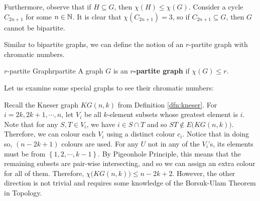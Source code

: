 \documentclass[math]{amznotes}
\makeatletter
\let\save@mathaccent\mathaccent
\newcommand*\if@single[3]{%
  \setbox0\hbox{${\mathaccent"0362{#1}}^H$}%
  \setbox2\hbox{${\mathaccent"0362{\kern0pt#1}}^H$}%
  \ifdim\ht0=\ht2 #3\else #2\fi
  }
\newcommand*\rel@kern[1]{\kern#1\dimexpr\macc@kerna}
\newcommand*\widebar[1]{\@ifnextchar^{{\wide@bar{#1}{0}}}{\wide@bar{#1}{1}}}
\newcommand*\wide@bar[2]{\if@single{#1}{\wide@bar@{#1}{#2}{1}}{\wide@bar@{#1}{#2}{2}}}
\newcommand*\wide@bar@[3]{%
  \begingroup
  \def\mathaccent##1##2{%
    \let\mathaccent\save@mathaccent
    \if#32 \let\macc@nucleus\first@char \fi
    \setbox\z@\hbox{$\macc@style{\macc@nucleus}_{}$}%
    \setbox\tw@\hbox{$\macc@style{\macc@nucleus}{}_{}$}%
    \dimen@\wd\tw@
    \advance\dimen@-\wd\z@
    \divide\dimen@ 3
    \@tempdima\wd\tw@
    \advance\@tempdima-\scriptspace
    \divide\@tempdima 10
    \advance\dimen@-\@tempdima
    \ifdim\dimen@>\z@ \dimen@0pt\fi
    \rel@kern{0.6}\kern-\dimen@
    \if#31
      \overline{\rel@kern{-0.6}\kern\dimen@\macc@nucleus\rel@kern{0.4}\kern\dimen@}%
      \advance\dimen@0.4\dimexpr\macc@kerna
      \let\final@kern#2%
      \ifdim\dimen@<\z@ \let\final@kern1\fi
      \if\final@kern1 \kern-\dimen@\fi
    \else
      \overline{\rel@kern{-0.6}\kern\dimen@#1}%
    \fi
  }%
  \macc@depth\@ne
  \let\math@bgroup\@empty \let\math@egroup\macc@set@skewchar
  \mathsurround\z@ \frozen@everymath{\mathgroup\macc@group\relax}%
  \macc@set@skewchar\relax
  \let\mathaccentV\macc@nested@a
  \if#31
    \macc@nested@a\relax111{#1}%
  \else
    \def\gobble@till@marker##1\endmarker{}%
    \futurelet\first@char\gobble@till@marker#1\endmarker
    \ifcat\noexpand\first@char A\else
      \def\first@char{}%
    \fi
    \macc@nested@a\relax111{\first@char}%
  \fi
  \endgroup
}
\theoremstyle{remark}
\newcommand{\0}{\mathbf{0}}
\newcommand{\1}{\mathbf{1}}
\makeatother
\begin{document}
Furthermore, observe that if $H \subseteq G$, then $\chi(H) \leq \chi(G)$. Consider a cycle $C_{2n + 1}$ for some $n \in \mathbb{N}$. It is clear that $\chi(C_{2n + 1}) = 3$, so if $C_{2n + 1} \subseteq G$, then $G$ cannot be bipartite.

Similar to bipartite graphs, we can define the notion of an $r$-partite graph with chromatic numbers.
\begin{dfnbox}{$r$-partite Graph}{rpartite}
    A graph $G$ is an {\color{red} \textbf{$r$-partite graph}} if $\chi(G) \leq r$.
\end{dfnbox}
Let us examine some special graphs to see their chromatic numbers:
Recall the Kneser graph $KG(n, k)$ from Definition \ref{dfn:kneser}. For $i = 2k, 2k + 1, \cdots, n$, let $V_i$ be all $k$-element subsets whose greatest element is $i$. Note that for any $S, T \in V_i$, we have $i \in S \cap T$ and so $ST \notin E\bigl(KG(n, k)\bigr)$. Therefore, we can colour each $V_i$ using a distinct colour $c_i$. Notice that in doing so, $(n - 2k + 1)$ colours are used. For any $U$ not in any of the $V_i$'s, its elements must be from $\left\{1, 2, \cdots, k - 1\right\}$. By Pigeonhole Principle, this means that the remaining subsets are pair-wise intersecting, and so we can assign an extra colour for all of them. Therefore, $\chi\bigl(KG(n, k)\bigr) \leq n - 2k + 2$. However, the other direction is not trivial and requires some knowledge of the Borsuk-Ulam Theorem in Topology.
\end{document}
